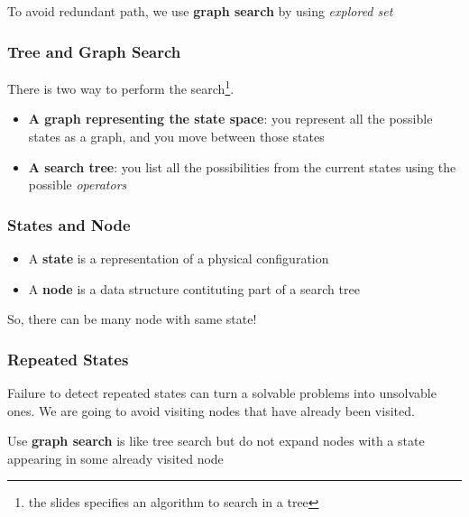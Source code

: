 \subparagraph{ } To avoid redundant path, we use \textbf{graph search}
by using \textit{explored set}

\subsubsection{Tree and Graph Search}

There is two way to  perform the search\footnote{the slides specifies an
algorithm to search in a tree}.

\begin{itemize}

    \item \textbf{A  graph representing the state  space}: you represent
all the possible states as a graph, and you move between those states

    \item \textbf{A  search tree}: you  list all the  possibilities from
the current states using the possible \textit{operators}

\end{itemize}

\subsubsection{States and Node}
\begin{itemize}
    \item A \textbf{state} is a representation of a physical
        configuration
    \item A \textbf{node} is a data structure contituting part
        of a search tree
\end{itemize}

So, there can be many node with same state!

\subsubsection{Repeated States}

Failure  to detect  repeated states  can turn  a solvable  problems into
unsolvable ones. We are going to  avoid visiting nodes that have already
been visited.

Use \textbf{graph  search} is like tree  search but do not  expand nodes
with a state appearing in some already visited node


